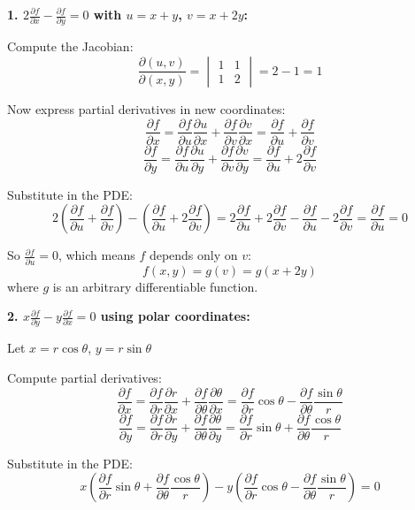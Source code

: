 \documentclass[12pt]{article}
\begin{document}
\begin{correctionbox}
\textbf{1. $2\frac{\partial f}{\partial x} - \frac{\partial f}{\partial y} = 0$ with $u = x + y$, $v = x + 2y$:}

Compute the Jacobian:
$$\frac{\partial (u,v)}{\partial (x,y)} = \begin{vmatrix} 1 & 1 \\ 1 & 2 \end{vmatrix} = 2 - 1 = 1$$

Now express partial derivatives in new coordinates:
$$\frac{\partial f}{\partial x} = \frac{\partial f}{\partial u}\frac{\partial u}{\partial x} + \frac{\partial f}{\partial v}\frac{\partial v}{\partial x} = \frac{\partial f}{\partial u} + \frac{\partial f}{\partial v}$$
$$\frac{\partial f}{\partial y} = \frac{\partial f}{\partial u}\frac{\partial u}{\partial y} + \frac{\partial f}{\partial v}\frac{\partial v}{\partial y} = \frac{\partial f}{\partial u} + 2\frac{\partial f}{\partial v}$$

Substitute in the PDE:
$$2\left(\frac{\partial f}{\partial u} + \frac{\partial f}{\partial v}\right) - \left(\frac{\partial f}{\partial u} + 2\frac{\partial f}{\partial v}\right) = 2\frac{\partial f}{\partial u} + 2\frac{\partial f}{\partial v} - \frac{\partial f}{\partial u} - 2\frac{\partial f}{\partial v} = \frac{\partial f}{\partial u} = 0$$

So $\frac{\partial f}{\partial u} = 0$, which means $f$ depends only on $v$:
$$f(x,y) = g(v) = g(x + 2y)$$
where $g$ is an arbitrary differentiable function.

\textbf{2. $x\frac{\partial f}{\partial y} - y\frac{\partial f}{\partial x} = 0$ using polar coordinates:}

Let $x = r\cos\theta$, $y = r\sin\theta$

Compute partial derivatives:
$$\frac{\partial f}{\partial x} = \frac{\partial f}{\partial r}\frac{\partial r}{\partial x} + \frac{\partial f}{\partial \theta}\frac{\partial \theta}{\partial x} = \frac{\partial f}{\partial r}\cos\theta - \frac{\partial f}{\partial \theta}\frac{\sin\theta}{r}$$
$$\frac{\partial f}{\partial y} = \frac{\partial f}{\partial r}\frac{\partial r}{\partial y} + \frac{\partial f}{\partial \theta}\frac{\partial \theta}{\partial y} = \frac{\partial f}{\partial r}\sin\theta + \frac{\partial f}{\partial \theta}\frac{\cos\theta}{r}$$

Substitute in the PDE:
$$x\left(\frac{\partial f}{\partial r}\sin\theta + \frac{\partial f}{\partial \theta}\frac{\cos\theta}{r}\right) - y\left(\frac{\partial f}{\partial r}\cos\theta - \frac{\partial f}{\partial \theta}\frac{\sin\theta}{r}\right) = 0$$


\end{correctionbox}
\end{document}
